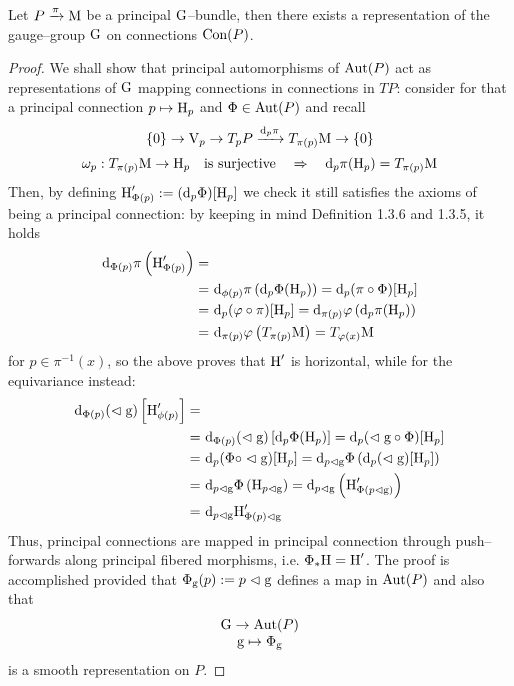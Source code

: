 \begin{prop}\label{conn_in_conn}
    Let $P\xrightarrow{\pi}\M$ be a principal $\G$--bundle, then there exists a representation of the gauge--group $\G$ on connections $\Con(P)$.
\end{prop}
\begin{proof}
We shall show that principal automorphisms of $\Aut(P)$ act as representations of $\G$ mapping connections in connections in $TP$: consider for that a principal connection $p\mapsto\H_p$ and $\Phi\in\Aut(P)$ and recall
    $$\{0\}\to\V_p\to T_pP\xrightarrow{\d_p\pi}T_{\pi(p)}\M\to\{0\}$$
    $$\omega_p:T_{\pi(p)}\M\to\H_p\quad\text{is surjective}\quad\Rightarrow\quad\d_p\pi(\H_p)=T_{\pi(p)}\M$$
    Then, by defining $\H'_{\Phi(p)}:=(\d_p\Phi)[\H_p]$ we check it still satisfies the axioms of being a principal connection: by keeping in mind Definition 1.3.6 and 1.3.5, it holds
    \begin{align*}
      \d_{\Phi(p)}\pi\left(\H'_{\Phi(p)}\right)=&\\
      =&\,\,\d_{\phi(p)}\pi\left(\d_p\Phi(\H_p)\right)=\d_p(\pi\circ\Phi)[\H_p]\\
      =&\,\,\d_p(\varphi\circ\pi)[\H_p]=\d_{\pi(p)}\varphi\left(\d_p\pi(\H_p)\right)\\
      =&\,\,\d_{\pi(p)}\varphi\left(T_{\pi(p)}\M\right)=T_{\varphi(x)}\M
    \end{align*}
    for $p\in\pi^{-1}(x)$, so the above proves that $\H'$ is horizontal, while for the equivariance instead:
    \begin{align*}
        \d_{\Phi(p)}(\vartriangleleft\g)\left[\H'_{\phi(p)}\right]=&\\
        =&\,\,\d_{\Phi(p)}(\vartriangleleft\g)\left[\d_p\Phi(\H_p)\right]=\d_p(\vartriangleleft\g\circ\Phi)[\H_p]\\
        =&\,\,\d_p(\Phi\circ\vartriangleleft\g)[\H_p]=\d_{p\vartriangleleft\g}\Phi\left(\d_p(\vartriangleleft\g)[\H_p]\right)\\
        =&\,\,\d_{p\vartriangleleft\g}\Phi\left(\H_{p\vartriangleleft\g}\right)=\d_{p\vartriangleleft\g}\left(\H'_{\Phi(p\vartriangleleft\g)}\right)\\
        =&\,\,\d_{p\vartriangleleft\g}\H'_{\Phi(p)\vartriangleleft\g}
    \end{align*}
    Thus, principal connections are mapped in principal connection through push--forwards along principal fibered morphisms, i.e. $\Phi_*\H=\H'$. The proof is accomplished provided that $\Phi_\g(p):=p\vartriangleleft\g$ defines a map in $\Aut(P)$ and also that
    $$\begin{matrix}
        \G\to\Aut(P)\\
        \g\mapsto\Phi_\g
    \end{matrix}$$
    is a smooth representation on $P$.
\end{proof}


